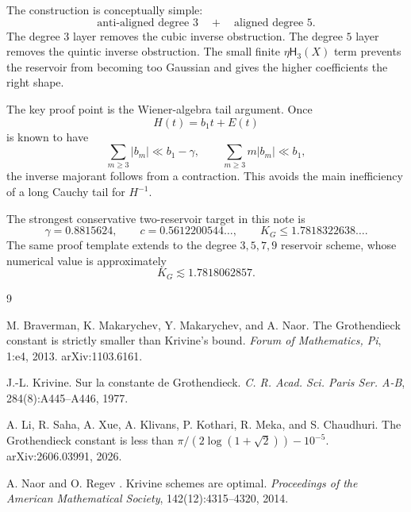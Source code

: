 \documentclass[11pt]{article}
\newcommand{\1}{\mathbf{1}}
\newcommand{\Herm}{\mathsf H}
\newcommand{\abs}[1]{\left\lvert #1\right\rvert}
\begin{document}
The construction is conceptually simple:
\[
        \text{anti-aligned degree }3
        \quad +\quad
        \text{aligned degree }5.
\]
The degree \(3\) layer removes the cubic inverse obstruction.  The degree \(5\) layer removes the quintic inverse obstruction.  The small finite \(\eta\Herm_3(X)\) term prevents the reservoir from becoming too Gaussian and gives the higher coefficients the right shape.

The key proof point is the Wiener-algebra tail argument.  Once
\[
        H(t)=b_1t+E(t)
\]
is known to have
\[
        \sum_{m\ge3}\abs{b_m}\ll b_1-\gamma,
        \qquad
        \sum_{m\ge3}m\abs{b_m}\ll b_1,
\]
the inverse majorant follows from a contraction.  This avoids the main inefficiency of a long Cauchy tail for \(H^{-1}\).

The strongest conservative two-reservoir target in this note is
\[
        \gamma=0.8815624,
        \qquad
        c=0.5612200544\ldots,
        \qquad
        K_G\le1.7818322638\ldots.
\]
The same proof template extends to the degree \(3,5,7,9\) reservoir scheme, whose numerical value is approximately
\[
        K_G\lesssim1.7818062857.
\]

\begin{thebibliography}{9}

M. Braverman, K. Makarychev, Y. Makarychev, and A. Naor.
\newblock The Grothendieck constant is strictly smaller than Krivine's bound.
\newblock \emph{Forum of Mathematics, Pi}, 1:e4, 2013.  arXiv:1103.6161.

J.-L. Krivine.
\newblock Sur la constante de Grothendieck.
\newblock \emph{C. R. Acad. Sci. Paris Ser. A-B}, 284(8):A445--A446, 1977.

A. Li, R. Saha, A. Xue, A. Klivans, P. Kothari, R. Meka, and S. Chaudhuri.
\newblock The Grothendieck constant is less than \(\pi/(2\log(1+\sqrt2))-10^{-5}\).
\newblock arXiv:2606.03991, 2026.

A. Naor and O. Regev .
\newblock Krivine schemes are optimal.
\newblock \emph{Proceedings of the American Mathematical Society}, 142(12):4315--4320, 2014.

\end{thebibliography}
\end{document}
